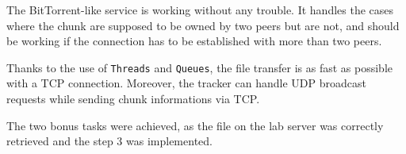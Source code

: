 The BitTorrent-like service is working without any trouble. It handles the cases where the chunk are supposed to be owned by two peers but are not, and should be working if the connection has to be established with more than two peers.

Thanks to the use of \texttt{Threads} and \texttt{Queues}, the file transfer is as fast as possible with a TCP connection. Moreover, the tracker can handle UDP broadcast requests while sending chunk informations via TCP.

The two bonus tasks were achieved, as the file on the lab server was correctly retrieved and the step 3 was implemented.